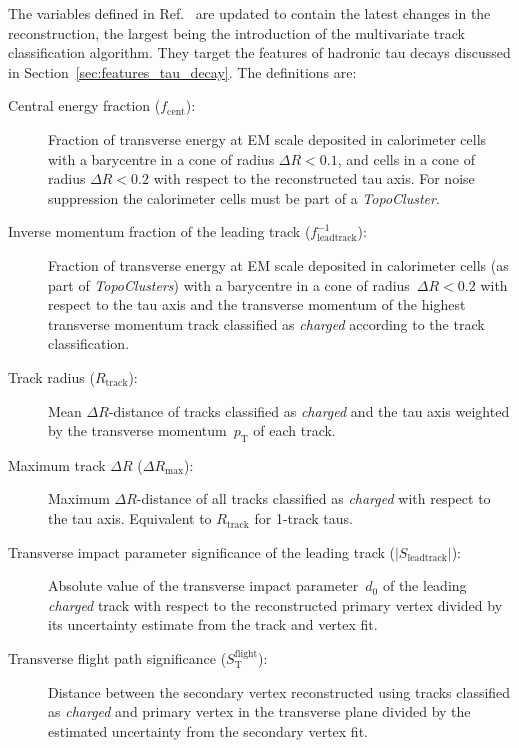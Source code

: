 The variables defined in Ref.~\cite{atlas:taurec:run2} are updated to contain
the latest changes in the reconstruction, the largest being the introduction of
the multivariate track classification algorithm. They target the features of
hadronic tau decays discussed in Section~\ref{sec:features_tau_decay}. The
definitions are:
\begin{description}
\item[Central energy fraction ($f_\text{cent}$):] Fraction of transverse energy
  at EM scale deposited in calorimeter cells with a barycentre in a cone of
  radius $\Delta R < 0.1$, and cells in a cone of radius $\Delta R < 0.2$ with
  respect to the reconstructed tau axis.
  For noise suppression the calorimeter cells must be part of a
  \emph{TopoCluster}.

\item[Inverse momentum fraction of the leading track
  ($f_\text{leadtrack}^{-1}$):] Fraction of transverse energy at EM scale
  deposited in calorimeter cells (as part of \emph{TopoClusters}) with a
  barycentre in a cone of radius~$\Delta R < 0.2$ with respect to the tau axis
  and the transverse momentum of the highest transverse momentum track
  classified as \emph{charged} according to the track classification.

\item[Track radius ($R_\text{track}$):] Mean $\Delta R$-distance of tracks
  classified as \emph{charged} and the tau axis weighted by the transverse
  momentum~$p_\text{T}$ of each track.

\item[Maximum track $\Delta R$ ($\Delta R_\text{max}$):] Maximum
  $\Delta R$-distance of all tracks classified as \emph{charged} with respect to
  the tau axis. Equivalent to $R_\text{track}$ for 1-track taus.

\item[Transverse impact parameter significance of the leading track
  ($| S_\text{leadtrack} |$):] Absolute value of the transverse impact
  parameter~$d_0$ of the leading \emph{charged} track with respect to the
  reconstructed primary vertex divided by its uncertainty estimate from the
  track and vertex fit.

\item[Transverse flight path significance ($S_\text{T}^\text{flight}$):]
  Distance between the secondary vertex reconstructed using tracks classified as
  \emph{charged} and primary vertex in the transverse plane divided by the
  estimated uncertainty from the secondary vertex fit.


\end{description}
